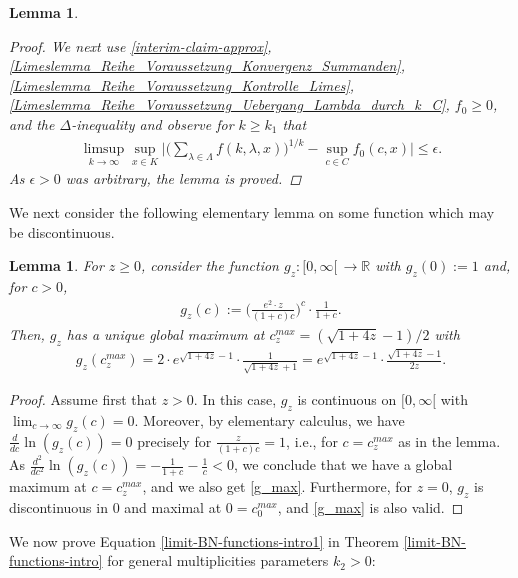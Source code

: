 \documentclass[reqno]{amsart}
\theoremstyle{plain}
\newtheorem{lemma}[theorem]{Lemma}
\theoremstyle{definition}
\numberwithin{equation}{section}
\newcommand{\R}{\mathbb{R}}
\newcommand{\ra}{\rightarrow}
\begin{document}
\begin{lemma}
\begin{proof}
We next use \eqref{interim-claim-approx},
\eqref{Limeslemma_Reihe_Voraussetzung_Konvergenz_Summanden},
\eqref{Limeslemma_Reihe_Voraussetzung_Kontrolle_Limes}, 
\eqref{Limeslemma_Reihe_Voraussetzung_Uebergang_Lambda_durch_k_C}, 
$f_0 \geq 0$, 
and the $\Delta$-inequality and observe for $k \geq k_1$ that
\begin{align*}
\limsup\limits_{k \to \infty} \sup\limits_{x \in K} \Bigg| 
\Bigg( \sum\limits_{\lambda\in\Lambda} f(k,\lambda,x) \Bigg)^{1/k} - \sup\limits_{c \in C} f_0(c,x) \Bigg| \leq \epsilon.
\end{align*}
As $\epsilon>0$ was arbitrary, the lemma is proved.
\end{proof}
\end{lemma}

We next consider the following elementary lemma on some function  which may be discontinuous.


\begin{lemma}\label{Maximum g_z}
For $z \geq 0$, consider the function $g_z:[0,\infty[\, \ra \R$ with $g_z(0):=1$ and, for $c>0$,
\begin{align*}
g_z(c) := \bigg( \frac{e^2 \cdot z}{(1+c)c} \bigg)^{c} \cdot \frac{1}{1+c}.
\end{align*}
Then, $g_z$ has a unique global maximum at $c^{max}_z = (\sqrt{1+4z}-1)/2$ with
\begin{align}\label{g_max}
g_z(c^{max}_z)=2 \cdot e^{\sqrt{1+4z}-1} \cdot \frac{1}{\sqrt{1+4z}+1}=e^{\sqrt{1+4z}-1} \cdot \frac{\sqrt{1+4z}-1}{2z}. 
\end{align}
\end{lemma}

\begin{proof} Assume first that $z > 0$. In this case, $g_z$ is continuous on $[0,\infty[$ with
      $\lim_{c\to\infty}g_z(c)=0$. Moreover, by elementary calculus, we have 
      $\frac{d}{dc} \ln(g_z(c))=0$ precisely for $\frac{z}{(1+c)c}=1$,  i.e., for $c = c^{max}_z$ as in the lemma.
      As $\frac{d^2}{dc^2} \ln(g_z(c)) = -\frac{1}{1+c} - \frac{1}{c} < 0$, we conclude that  we have a global
      maximum at $c = c^{max}_z$, and we also get \eqref{g_max}.
      Furthermore, for $z=0$, $g_z$ is discontinuous in $0$ and maximal at $0=c^{max}_0$, and \eqref{g_max} is also valid.
\end{proof}


We now prove Equation \eqref{limit-BN-functions-intro1} in Theorem \ref{limit-BN-functions-intro} for general multiplicities parameters $k_2>0$:
\end{document}
